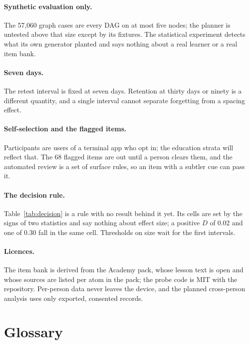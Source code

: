\documentclass[11pt]{article}
\begin{document}
\paragraph{Synthetic evaluation only.}
The 57,060 graph cases are every DAG on at most five nodes; the planner is untested above that size except by its fixtures. The statistical experiment detects what its own generator planted and says nothing about a real learner or a real item bank.

\paragraph{Seven days.}
The retest interval is fixed at seven days. Retention at thirty days or ninety is a different quantity, and a single interval cannot separate forgetting from a spacing effect.

\paragraph{Self-selection and the flagged items.}
Participants are users of a terminal app who opt in; the education strata will reflect that. The 68 flagged items are out until a person clears them, and the automated review is a set of surface rules, so an item with a subtler cue can pass it.

\paragraph{The decision rule.}
Table~\ref{tab:decision} is a rule with no result behind it yet. Its cells are set by the signs of two statistics and say nothing about effect size; a positive $D$ of 0.02 and one of 0.30 fall in the same cell. Thresholds on size wait for the first intervals.

\paragraph{Licences.}
The item bank is derived from the Academy pack, whose lesson text is open and whose sources are listed per atom in the pack; the probe code is MIT with the repository. Per-person data never leaves the device, and the planned cross-person analysis uses only exported, consented records.

\printbibliography

\appendix

\section{Glossary}
\label{app:glossary}
\end{document}

